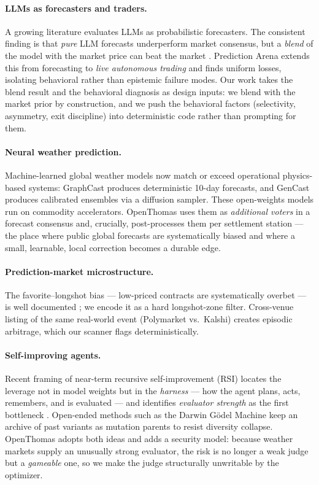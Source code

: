 \documentclass[sigconf,review,anonymous]{acmart}
\begin{document}
\paragraph{LLMs as forecasters and traders.} A growing literature evaluates LLMs
as probabilistic forecasters. The consistent finding is that \emph{pure} LLM
forecasts underperform market consensus, but a \emph{blend} of the model with the
market price can beat the market \cite{blend}. Prediction Arena \cite{predarena}
extends this from forecasting to \emph{live autonomous trading} and finds uniform
losses, isolating behavioral rather than epistemic failure modes. Our work takes
the blend result and the behavioral diagnosis as design inputs: we blend with the
market prior by construction, and we push the behavioral factors (selectivity,
asymmetry, exit discipline) into deterministic code rather than prompting for
them.

\paragraph{Neural weather prediction.} Machine-learned global weather models now
match or exceed operational physics-based systems: GraphCast \cite{graphcast}
produces deterministic 10-day forecasts, and GenCast \cite{gencast} produces
calibrated ensembles via a diffusion sampler. These open-weights models run on
commodity accelerators. OpenThomas uses them as \emph{additional voters} in a
forecast consensus and, crucially, post-processes them per settlement station ---
the place where public global forecasts are systematically biased and where a
small, learnable, local correction becomes a durable edge.

\paragraph{Prediction-market microstructure.} The favorite--longshot bias ---
low-priced contracts are systematically overbet --- is well documented
\cite{longshot}; we encode it as a hard longshot-zone filter. Cross-venue listing
of the same real-world event (Polymarket vs.\ Kalshi) creates episodic
arbitrage, which our scanner flags deterministically.

\paragraph{Self-improving agents.} Recent framing of near-term recursive
self-improvement (RSI) locates the leverage not in model weights but in the
\emph{harness} --- how the agent plans, acts, remembers, and is evaluated --- and
identifies \emph{evaluator strength} as the first bottleneck \cite{harness}.
Open-ended methods such as the Darwin G\"odel Machine \cite{dgm} keep an archive
of past variants as mutation parents to resist diversity collapse. OpenThomas
adopts both ideas and adds a security model: because weather markets supply an
unusually strong evaluator, the risk is no longer a weak judge but a
\emph{gameable} one, so we make the judge structurally unwritable by the
optimizer.
\end{document}
